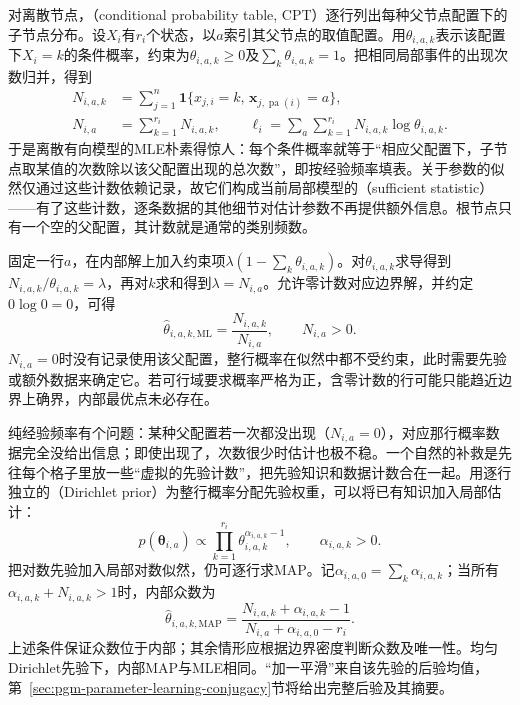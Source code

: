 对离散节点，（conditional probability table, CPT）逐行列出每种父节点配置下的子节点分布。设$X_i$有$r_i$个状态，以$a$索引其父节点的取值配置。用$\theta_{i,a,k}$表示该配置下$X_i=k$的条件概率，约束为$\theta_{i,a,k}\geq0$及$\sum_k\theta_{i,a,k}=1$。把相同局部事件的出现次数归并，得到
\begin{equation}
  \begin{aligned}
    N_{i,a,k}
      &=\sum_{j=1}^n
        \mathbf{1}\{x_{j,i}=k,\,
          \bm{x}_{j,\operatorname{pa}(i)}=a\},\\
    N_{i,a}&=\sum_{k=1}^{r_i}N_{i,a,k},\qquad
    \ell_i=\sum_a\sum_{k=1}^{r_i}
      N_{i,a,k}\log\theta_{i,a,k}.
  \end{aligned}
  \label{eq:pgm-parameter-learning-counts}
\end{equation}
于是离散有向模型的MLE朴素得惊人：每个条件概率就等于“相应父配置下，子节点取某值的次数除以该父配置出现的总次数”，即按经验频率填表。关于参数的似然仅通过这些计数依赖记录，故它们构成当前局部模型的（sufficient statistic）——有了这些计数，逐条数据的其他细节对估计参数不再提供额外信息。根节点只有一个空的父配置，其计数就是通常的类别频数。

固定一行$a$，在内部解上加入约束项$\lambda(1-\sum_k\theta_{i,a,k})$。对$\theta_{i,a,k}$求导得到$N_{i,a,k}/\theta_{i,a,k}=\lambda$，再对$k$求和得到$\lambda=N_{i,a}$。允许零计数对应边界解，并约定$0\log0=0$，可得
\begin{equation}
  \widehat{\theta}_{i,a,k,\mathrm{ML}}
    =\frac{N_{i,a,k}}{N_{i,a}},\qquad N_{i,a}>0.
  \label{eq:pgm-parameter-learning-cpt-mle}
\end{equation}
$N_{i,a}=0$时没有记录使用该父配置，整行概率在似然中都不受约束，此时需要先验或额外数据来确定它。若可行域要求概率严格为正，含零计数的行可能只能趋近边界上确界，内部最优点未必存在。

纯经验频率有个问题：某种父配置若一次都没出现（$N_{i,a}=0$），对应那行概率数据完全没给出信息；即使出现了，次数很少时估计也极不稳。一个自然的补救是先往每个格子里放一些“虚拟的先验计数”，把先验知识和数据计数合在一起。用逐行独立的（Dirichlet prior）为整行概率分配先验权重，可以将已有知识加入局部估计：
\[
  p(\bm{\theta}_{i,a})
  \propto\prod_{k=1}^{r_i}
    \theta_{i,a,k}^{\alpha_{i,a,k}-1},
  \qquad \alpha_{i,a,k}>0.
\]
把对数先验加入局部对数似然，仍可逐行求MAP。记$\alpha_{i,a,0}=\sum_k\alpha_{i,a,k}$；当所有$\alpha_{i,a,k}+N_{i,a,k}>1$时，内部众数为
\begin{equation}
  \widehat{\theta}_{i,a,k,\mathrm{MAP}}
    =\frac{N_{i,a,k}+\alpha_{i,a,k}-1}
            {N_{i,a}+\alpha_{i,a,0}-r_i}.
  \label{eq:pgm-parameter-learning-cpt-map}
\end{equation}
上述条件保证众数位于内部；其余情形应根据边界密度判断众数及唯一性。均匀Dirichlet先验下，内部MAP与MLE相同。“加一平滑”来自该先验的后验均值，第~\ref{sec:pgm-parameter-learning-conjugacy}节将给出完整后验及其摘要。

